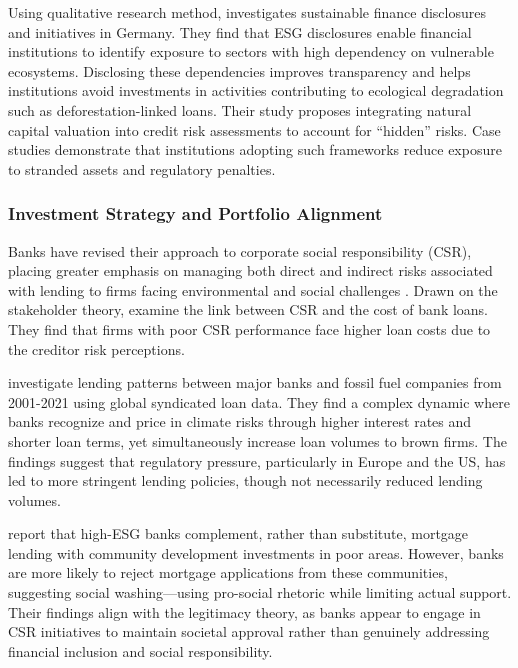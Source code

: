 \documentclass[
  authoryear]{elsarticle}
\begin{document}
Using qualitative research method, \citet{KUHN2022} investigates
sustainable finance disclosures and initiatives in Germany. They find
that ESG disclosures enable financial institutions to identify exposure
to sectors with high dependency on vulnerable ecosystems. Disclosing
these dependencies improves transparency and helps institutions avoid
investments in activities contributing to ecological degradation such as
deforestation-linked loans. Their study proposes integrating natural
capital valuation into credit risk assessments to account for ``hidden''
risks. Case studies demonstrate that institutions adopting such
frameworks reduce exposure to stranded assets and regulatory penalties.

\subsubsection{Investment Strategy and Portfolio
Alignment}\label{investment-strategy-and-portfolio-alignment}

Banks have revised their approach to corporate social responsibility
(CSR), placing greater emphasis on managing both direct and indirect
risks associated with lending to firms facing environmental and social
challenges \citep{CARNEVALE2012}. Drawn on the stakeholder theory,
\citet{GOSS2011} examine the link between CSR and the cost of bank
loans. They find that firms with poor CSR performance face higher loan
costs due to the creditor risk perceptions.

\citet{DEMETRIADES2025} investigate lending patterns between major banks
and fossil fuel companies from 2001-2021 using global syndicated loan
data. They find a complex dynamic where banks recognize and price in
climate risks through higher interest rates and shorter loan terms, yet
simultaneously increase loan volumes to brown firms. The findings
suggest that regulatory pressure, particularly in Europe and the US, has
led to more stringent lending policies, though not necessarily reduced
lending volumes.

\citet{BASU2022} report that high-ESG banks complement, rather than
substitute, mortgage lending with community development investments in
poor areas. However, banks are more likely to reject mortgage
applications from these communities, suggesting social washing---using
pro-social rhetoric while limiting actual support. Their findings align
with the legitimacy theory, as banks appear to engage in CSR initiatives
to maintain societal approval rather than genuinely addressing financial
inclusion and social responsibility.
\end{document}

